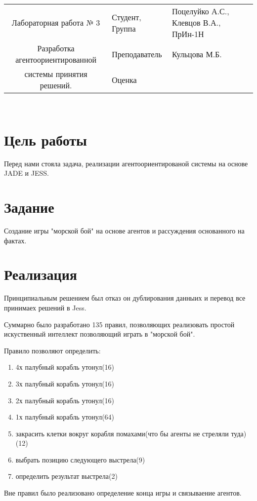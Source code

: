\documentclass[a4paper,english,russian]{article}
\begin{document}
\begin{tabular}{|c|l|l|}
\hline    Лабораторная работа № 3 & Студент, Группа & Поцелуйко А.С., Клевцов В.А., ПрИн-1Н\\ \cline{2-3} 
                          Разработка агентоориентированной          & Преподаватель & Кульцова М.Б. \\ \cline{2-3} 
           системы принятия решений.                         & Оценка & \\ \hline 
\end{tabular}
\\
\section{Цель работы} %
\par Перед нами стояла задача, реализации агентоориентированой системы на основе JADE и JESS.
\section{Задание} %
\par Создание игры "морской бой" на основе агентов и рассуждения основанного на фактах.
\section{Реализация} %
\par Принципиальным решением был отказ он дублирования данныих и перевод все принимаех решений в Jess.
\par Суммарно было разработано 135 правил, позволяющих реализовать простой искуственный интеллект позволяющий играть в "морской бой".
\par Правило позволяют определить:
\begin{enumerate}
    \item 4х палубный корабль утонул(16)
    \item 3х палубный корабль утонул(16)
    \item 2х палубный корабль утонул(16)
    \item 1х палубный корабль утонул(64)
    \item закрасить клетки вокруг корабля помахами(что бы агенты не стреляли туда)(12)
    \item выбрать позицию следующего выстрела(9)
    \item определить результат выстрела(2)
\end{enumerate}
\par Вне правил было реализовано определение конца игры и связываение агентов.
\end{document}
